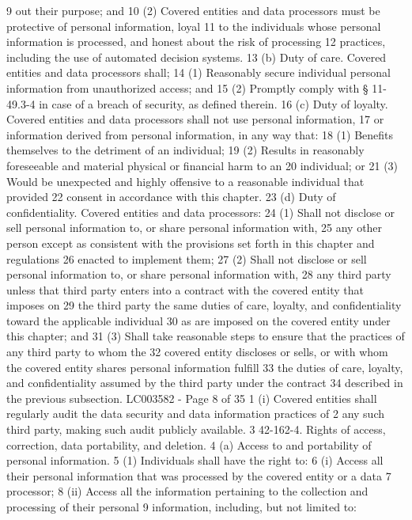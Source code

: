 9 out their purpose; and
10 (2) Covered entities and data processors must be protective of personal information, loyal
11 to the individuals whose personal information is processed, and honest about the risk of processing
12 practices, including the use of automated decision systems.
13 (b) Duty of care. Covered entities and data processors shall;
14 (1) Reasonably secure individual personal information from unauthorized access; and
15 (2) Promptly comply with § 11-49.3-4 in case of a breach of security, as defined therein.
16 (c) Duty of loyalty. Covered entities and data processors shall not use personal information,
17 or information derived from personal information, in any way that:
18 (1) Benefits themselves to the detriment of an individual;
19 (2) Results in reasonably foreseeable and material physical or financial harm to an
20 individual; or
21 (3) Would be unexpected and highly offensive to a reasonable individual that provided
22 consent in accordance with this chapter.
23 (d) Duty of confidentiality. Covered entities and data processors:
24 (1) Shall not disclose or sell personal information to, or share personal information with,
25 any other person except as consistent with the provisions set forth in this chapter and regulations
26 enacted to implement them;
27 (2) Shall not disclose or sell personal information to, or share personal information with,
28 any third party unless that third party enters into a contract with the covered entity that imposes on
29 the third party the same duties of care, loyalty, and confidentiality toward the applicable individual
30 as are imposed on the covered entity under this chapter; and
31 (3) Shall take reasonable steps to ensure that the practices of any third party to whom the
32 covered entity discloses or sells, or with whom the covered entity shares personal information fulfill
33 the duties of care, loyalty, and confidentiality assumed by the third party under the contract
34 described in the previous subsection.
LC003582 - Page 8 of 35
1 (i) Covered entities shall regularly audit the data security and data information practices of
2 any such third party, making such audit publicly available.
3 42-162-4. Rights of access, correction, data portability, and deletion.
4 (a) Access to and portability of personal information.
5 (1) Individuals shall have the right to:
6 (i) Access all their personal information that was processed by the covered entity or a data
7 processor;
8 (ii) Access all the information pertaining to the collection and processing of their personal
9 information, including, but not limited to:
